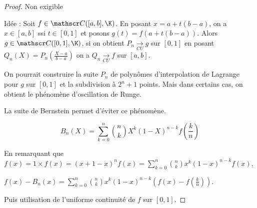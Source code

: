 \begin{proof}
    Non exigible 

    Idée : Soit $f \in \mathscr C([a, b], \K)$. En posant $x = a + t (b - a)$, on a 
    $x \in [a, b]$ ssi $t \in [0, 1]$ et posons $g(t) = f(a + t (b - a))$. 
    Alors $g \in \mathscr C([0, 1], \K)$, si on obtient $P_n \xrightarrow[CU]{} g$ sur $[0, 1]$
    en posant $Q_n(X) = P_n \left( \frac{X - a}{b - a} \right)$ on a $Q_n \xrightarrow[CU]{} f$ sur $[a, b]$.

    On pourrait construire la suite $P_n$ de polynômes d'interpolation de Lagrange pour 
    $g$ sur $[0, 1]$ et la subdivision à $2^{n} + 1$ points. Mais dans certains cas, on obtient 
    le phénomène d'oscillation de Runge.

    La suite de Bernstein permet d'éviter ce phénomène.

    \[B_n(X) = \sum_{k = 0}^{n} \binom{n}{k} X^k (1 - X)^{n - k} f\left( \frac k n \right)\]

    En remarquant que $\displaystyle f(x) = 1 \times f(x) = (x + 1 - x)^n f(x) = \sum_{k = 0}^{n} \binom{n}{k} x^k (1 - x)^{n - k} f(x)$,

    $\displaystyle f(x) - B_n(x) = \sum_{k = 0}^{n} \binom{n}{k} x^k (1 - x)^{n - k} \left( f(x) - f\left( \frac k n \right) \right)$.

    Puis utilisation de l'uniforme continuité de $f$ sur $[0, 1]$.
\end{proof}


